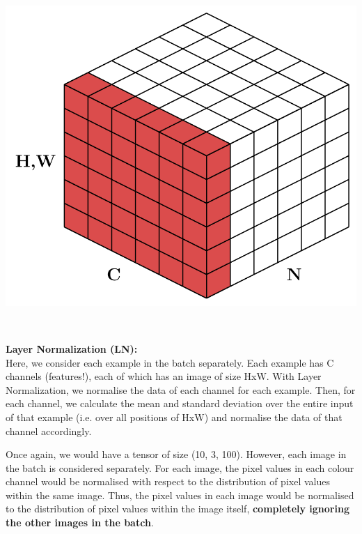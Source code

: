 \begin{minipage}{0.55\textwidth}
\includegraphics[width=\textwidth]{tikz/chapter3 - Layer Norm.pdf}
\end{minipage}
\begin{minipage}{0.05\textwidth}
\ 
\end{minipage}
\begin{minipage}{0.4\textwidth}
\textbf{\textcolor{myred!70}{Layer Normalization (LN):}} \\

Here, we consider each example in the batch separately. Each example has C channels (features!), each of which has an image of size HxW. With Layer Normalization, we normalise the data of each channel for each example. Then, for each channel, we calculate the mean and standard deviation over the entire input of that example (i.e. over all positions of HxW) and normalise the data of that channel accordingly.
\end{minipage}

Once again, we would have a tensor of size (10, 3, 100).
However, each image in the batch is considered separately. For each image, the pixel values in each colour channel would be normalised with respect to the distribution of pixel values within the same image.
Thus, the pixel values in each image would be normalised to the distribution of pixel values within the image itself, \textbf{completely ignoring the other images in the batch}.


